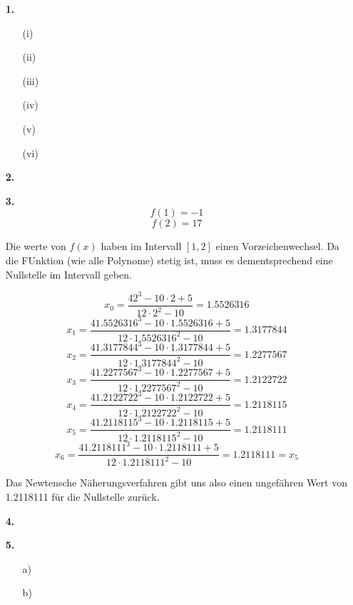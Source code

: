 \documentclass[a4paper,11pt]{scrartcl}
\author{\authorinfo}
\title{\titleinfo}
\date{\today}
\begin{document}
\maketitle
\begin{enumerate}
    \item[\textbf{1.}]
        \begin{enumerate}
            \item[(i)] 
            \item[(ii)] 
            \item[(iii)]
            \item[(iv)] 
            \item[(v)]  
            \item[(vi)] 
        \end{enumerate}

    \item[\textbf{2.}]


    \item[\textbf{3.}]
        \[ f(1) = -1 \]
        \[ f(2) = 17 \]

        Die werte von $f(x)$ haben im Intervall $[1,2]$ einen Vorzeichenwechsel. Da die FUnktion (wie alle Polynome) stetig ist,
        muss es dementsprechend eine Nullstelle im Intervall geben.

        \[ x_0 = \frac{42^3 - 10 \cdot 2 + 5}{12 \cdot 2^2 - 10} = 1.5526316\]
        \[ x_1 = \frac{41.5526316^3 - 10 \cdot 1.5526316 + 5}{12 \cdot 1.5526316^2 - 10} = 1.3177844\]
        \[ x_2 = \frac{41.3177844^3 - 10 \cdot 1.3177844 + 5}{12 \cdot 1.3177844^2 - 10} = 1.2277567\]
        \[ x_3 = \frac{41.2277567^3 - 10 \cdot 1.2277567 + 5}{12 \cdot 1.2277567^2 - 10} = 1.2122722\]
        \[ x_4 = \frac{41.2122722^3 - 10 \cdot 1.2122722 + 5}{12 \cdot 1.2122722^2 - 10} = 1.2118115\]
        \[ x_5 = \frac{41.2118115^3 - 10 \cdot 1.2118115 + 5}{12 \cdot 1.2118115^2 - 10} = 1.2118111\]
        \[ x_6 = \frac{41.2118111^3 - 10 \cdot 1.2118111 + 5}{12 \cdot 1.2118111^2 - 10} = 1.2118111 = x_5\]

        Das Newtensche Näherungsverfahren gibt uns also einen ungefähren Wert von 1.2118111 für die Nullstelle zurück.

    \newpage
    \item[\textbf{4.}]
    \item[\textbf{5.}]
        \begin{enumerate}
            \item[a)]
            \item[b)]
        \end{enumerate}
    \end{enumerate}
\end{document}
